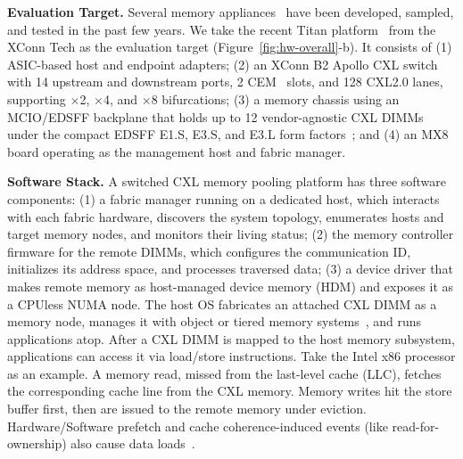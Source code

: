 \noindent
{\bf Evaluation Target.} Several memory appliances~\cite{samsung-cmmb, h3-falcon, unifabrix-max, omega-fabric, xconn-titan} have been developed, sampled, and tested in the past few years. We take the recent Titan platform~\cite{xconn-titan} from the XConn Tech as the evaluation target (Figure~\ref{fig:hw-overall}-b).
It consists of (1) ASIC-based host and endpoint adapters;
(2) an XConn B2 Apollo CXL switch with 14 upstream and downstream ports, 2 CEM~\cite{cem-pcie} slots, and 128 CXL2.0 lanes, supporting $\times$2, $\times$4, and $\times$8 bifurcations;
(3) a memory chassis using an MCIO/EDSFF backplane that holds up to 12 vendor-agnostic CXL DIMMs~\cite{smart-cxldimm, micron-cxldimm} under the compact EDSFF E1.S, E3.S, and E3.L form factors~\cite{jedec-cxldimm}; and (4) an MX8 board operating as the management host and fabric manager.


\noindent
{\bf Software Stack.} A switched CXL memory pooling platform has three software components: (1) a fabric manager running on a dedicated host, which interacts with each fabric hardware, discovers the system topology, enumerates hosts and target memory nodes, and monitors their living status; (2) the memory controller firmware for the remote DIMMs, which configures the communication ID, initializes its address space, and processes traversed data; (3) a device driver that makes remote memory as host-managed device memory (HDM) and exposes it as a CPUless NUMA node. The host OS fabricates an attached CXL DIMM as a memory node, manages it with object or tiered memory systems~\cite{directcxl-atc22, pond-asplos23, tpp-asplos23, cxlshm-sosp23, nomad-osdi24, aol-osdi25, collid-sosp24, hybridtier-asplos25}, and runs applications atop. After a CXL DIMM is mapped to the host memory subsystem, applications can access it via load/store instructions. Take the Intel x86 processor as an example. A memory read, missed from the last-level cache (LLC), fetches the corresponding cache line from the CXL memory. Memory writes hit the store buffer first, then are issued to the remote memory under eviction. Hardware/Software prefetch and cache coherence-induced events (like read-for-ownership) also cause data loads~\cite{melody-asplos25, pathfinder-sigcomm25}.

